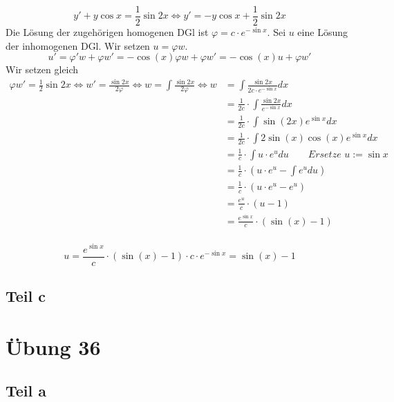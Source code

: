 \documentclass[10pt,a4paper]{article}
\begin{document}
\begin{equation}
y' + y \cos x = \frac{1}{2} \sin 2x \Leftrightarrow y' = -y \cos x + \frac{1}{2} \sin 2x
\end{equation}
Die Lösung der zugehörigen homogenen DGl ist $\varphi = c \cdot e^{-\sin x}$.
Sei $u$ eine Lösung der inhomogenen DGl.
Wir setzen $u = \varphi w$.
\begin{equation}
u' = \varphi' w + \varphi w' = -\cos(x) \varphi w + \varphi w' = -\cos(x) u + \varphi w'
\end{equation}
Wir setzen gleich
\begin{align*}
\varphi w' = \frac{1}{2} \sin 2x \Leftrightarrow w' = \frac{\sin 2x}{2 \varphi} \Leftrightarrow w = \int \frac{\sin 2x}{2 \varphi} \Leftrightarrow w & = \int \frac{\sin 2x}{2 c \cdot e^{- \sin x}} dx\\
& = \frac{1}{2c} \cdot \int \frac{\sin 2x}{e^{- \sin x}} dx\\
& = \frac{1}{2c} \cdot \int \sin(2x)e^{\sin x} dx\\
& = \frac{1}{2c} \cdot \int 2\sin(x)\cos(x)e^{\sin x} dx\\
& = \frac{1}{c} \cdot \int u \cdot e^{u} du \qquad \textit{Ersetze $u := \sin x$}\\
& = \frac{1}{c} \cdot \left( u \cdot e^{u} - \int e^{u} du \right)\\
& = \frac{1}{c} \cdot \left( u \cdot e^{u} - e^{u} \right)\\
& = \frac{e^{u}}{c} \cdot \left( u - 1 \right)\\
& = \frac{e^{\sin x}}{c} \cdot \left( \sin(x) - 1 \right)\\
\end{align*}

\begin{equation}
u = \frac{e^{\sin x}}{c} \cdot \left( \sin(x) - 1 \right) \cdot c \cdot e^{-\sin x} = \sin(x) - 1
\end{equation}

\subsection*{Teil c}

\section*{Übung 36}

\subsection*{Teil a}
\end{document}
